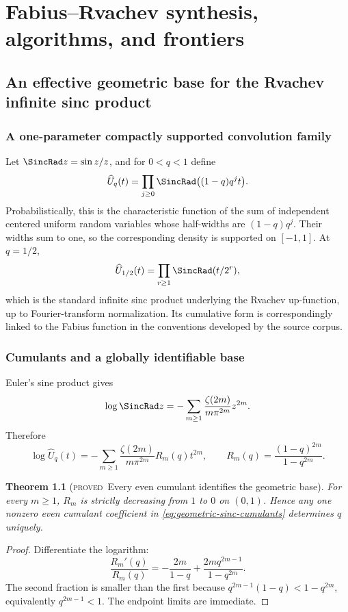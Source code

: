 \documentclass[11pt,letterpaper,oneside,openany]{book}
\newtheorem{theorem}{Theorem}[chapter]
\theoremstyle{definition}
\theoremstyle{remark}
\newcommand{\statusproved}{\textcolor{provedgreen}{\textsc{proved}}}
\begin{document}
\part{Fabius--Rvachev synthesis, algorithms, and frontiers}

\chapter{An effective geometric base for the Rvachev infinite sinc product}

\section{A one-parameter compactly supported convolution family}
Let \(\SincRad z=\sin z/z\), and for \(0<q<1\) define
\begin{equation}
 \widehat U_q(t)=\prod_{j\ge0}
 \SincRad\bigl((1-q)q^jt\bigr).
 \label{eq:geometric-sinc-family}
\end{equation}
Probabilistically, this is the characteristic function of the sum of
independent centered uniform random variables whose half-widths are
\((1-q)q^j\).  Their widths sum to one, so the corresponding density is
supported on \([-1,1]\).  At \(q=1/2\),
\[
 \widehat U_{1/2}(t)=\prod_{r\ge1}\SincRad(t/2^r),
\]
which is the standard infinite sinc product underlying the Rvachev up-function,
up to Fourier-transform normalization.  Its cumulative form is correspondingly
linked to the Fabius function in the conventions developed by the source
corpus.

\section{Cumulants and a globally identifiable base}
Euler's sine product gives
\[
 \log\SincRad z
 =-\sum_{m\ge1}\frac{\zeta(2m)}{m\pi^{2m}}z^{2m}.
\]
Therefore
\begin{equation}
 \log\widehat U_q(t)=
 -\sum_{m\ge1}\frac{\zeta(2m)}{m\pi^{2m}}
 R_m(q)t^{2m},
 \qquad
 R_m(q)=\frac{(1-q)^{2m}}{1-q^{2m}}.
 \label{eq:geometric-sinc-cumulants}
\end{equation}

\begin{theorem}[\statusproved\ Every even cumulant identifies the geometric
base]
For every \(m\ge1\), \(R_m\) is strictly decreasing from \(1\) to \(0\) on
\((0,1)\).  Hence any one nonzero even cumulant coefficient in
\cref{eq:geometric-sinc-cumulants} determines \(q\) uniquely.
\end{theorem}
\begin{proof}
Differentiate the logarithm:
\[
 \frac{R_m'(q)}{R_m(q)}
 =-\frac{2m}{1-q}+\frac{2mq^{2m-1}}{1-q^{2m}}.
\]
The second fraction is smaller than the first because
\(q^{2m-1}(1-q)<1-q^{2m}\), equivalently \(q^{2m-1}<1\).  The endpoint limits
are immediate.
\end{proof}
\end{document}
